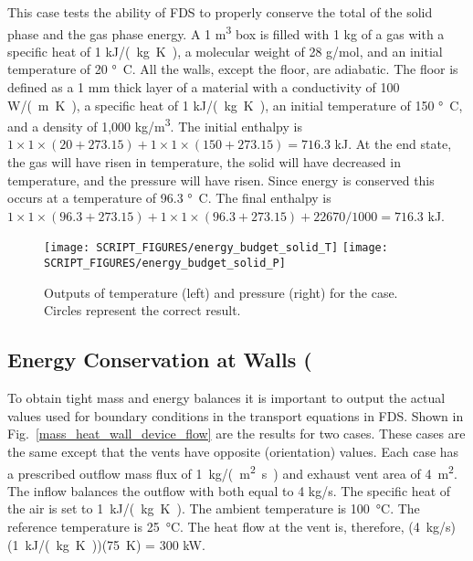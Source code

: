 \documentclass[11pt]{book}
\begin{document}
This case tests the ability of FDS to properly conserve the total of the solid phase and the gas phase energy.  A 1 \si{m^3} box is filled with 1 kg of a gas with a specific heat of 1 \si{kJ/(kg.K)}, a molecular weight of 28 g/mol, and an initial temperature of 20 \si{\degree C}.  All the walls, except the floor, are adiabatic.  The floor is defined as a 1 mm thick layer of a material with a conductivity of 100 \si{W/(m.K)},  a specific heat of 1 \si{kJ/(kg.K)}, an initial temperature of 150 \si{\degree C}, and a density of 1,000 \si{kg/m^3}.  The initial enthalpy is $1 \times 1 \times (20+273.15) + 1 \times 1 \times (150+273.15)  =  716.3$ kJ.  At the end state, the gas will have risen in temperature, the solid will have decreased in temperature, and the pressure will have risen.  Since energy is conserved this occurs at a temperature of 96.3 \si{\degree C}.  The final enthalpy is $1 \times 1 \times (96.3+273.15) + 1 \times 1 \times (96.3+273.15) + 22670 / 1000  =  716.3$ kJ.

\begin{figure}[ht]
\texttt{[image: SCRIPT\_FIGURES/energy\_budget\_solid\_T]}
\texttt{[image: SCRIPT\_FIGURES/energy\_budget\_solid\_P]}
\caption[The  test case]{\label{fig_solid_energy} Outputs of temperature (left) and pressure (right) for the  case.  Circles represent the correct result.}
\end{figure}



\subsection{Energy Conservation at Walls (\texorpdfstring{})}
\label{mass_heat_wall_device_test}
\label{mass_heat_wall_device_test_2}

To obtain tight mass and energy balances it is important to output the actual values used for boundary conditions in the transport equations in FDS. Shown in Fig.~\ref{mass_heat_wall_device_flow} are the results for two cases.  These cases are the same except that the vents have opposite  (orientation) values.  Each case has a prescribed outflow mass flux of 1~\si{kg/(m^2.s)} and exhaust vent area of 4~\si{m^2}. The inflow balances the outflow with both equal to 4 \si{kg/s}.  The specific heat of the air is set to 1~\si{kJ/(kg.K)}.  The ambient temperature is 100~\si{\degreeCelsius}.  The reference temperature is 25~\si{\degreeCelsius}.  The heat flow at the vent is, therefore, (4~\si{kg/s})(1~\si{kJ/(kg.K)})(75~K) = 300 kW.
\end{document}
